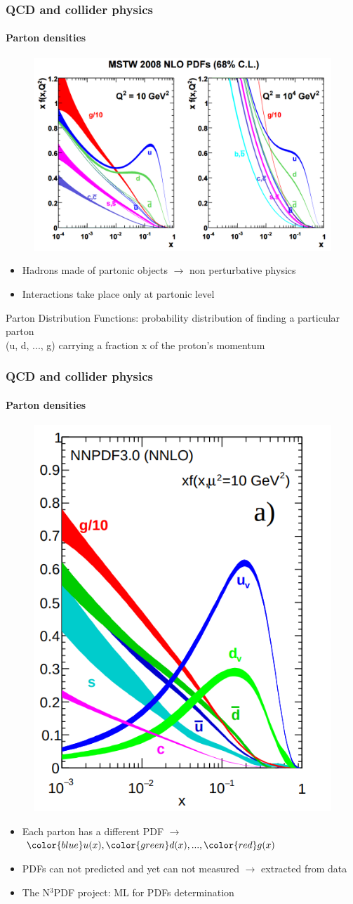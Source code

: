 \documentclass[aspectratio=43]{beamer}
\begin{document}
\begin{frame}
	
	\frametitle{QCD and collider physics}
	\framesubtitle{Parton densities}
	
	\begin{figure}
		\includegraphics[width = 6 cm]{plots/part1/chapter2/PDFs.png}
	\end{figure}
	
	\begin{itemize}
		\item \footnotesize Hadrons made of partonic objects $\longrightarrow$ non perturbative physics
		\item \footnotesize Interactions take place only at partonic level
	\end{itemize}
	
	{\color{blue} \footnotesize Parton Distribution Functions: probability distribution of finding a particular parton \\ (u, d, ..., g) carrying a fraction x of the proton's momentum}

\end{frame}

\begin{frame}
	
	\frametitle{QCD and collider physics}
	\framesubtitle{Parton densities}
	
	\begin{figure}
		\includegraphics[width = 3 cm]{plots/part1/chapter2/PDF.png}
	\end{figure}
	
	\begin{itemize}
		\item \footnotesize Each parton has a different PDF $\longrightarrow$ ${\color{blue}u(x)}, {\color{green}d(x)}, ..., {\color{red}g(x)}$
		\item \footnotesize PDFs can not predicted and yet can not measured $\longrightarrow$ {\color{blue}extracted} from data
		\item \footnotesize The N$^{3}$PDF project: ML for PDFs determination
	\end{itemize}

\end{frame}
\end{document}
